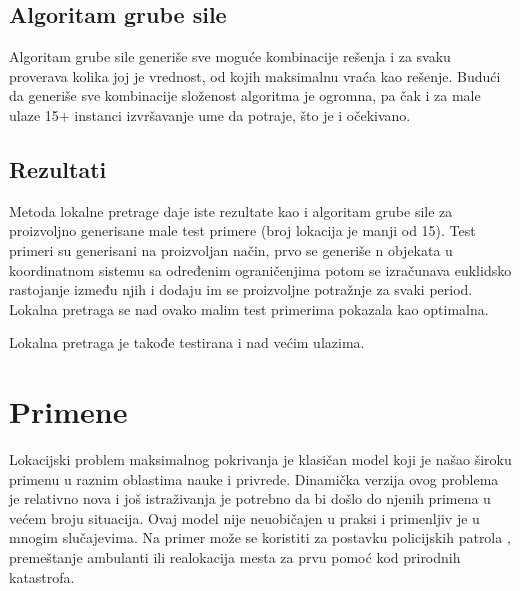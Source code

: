 \documentclass[a4paper]{article}
\begin{document}
\subsection{Algoritam grube sile}
Algoritam grube sile generiše sve moguće kombinacije rešenja i za svaku proverava kolika joj je vrednost, od kojih maksimalnu vraća kao rešenje. Budući da generiše sve kombinacije složenost algoritma je ogromna, pa čak i za male ulaze 15+ instanci izvršavanje ume da potraje, što je i očekivano.

\subsection{Rezultati}
Metoda lokalne pretrage daje iste rezultate kao i algoritam grube sile za proizvoljno generisane male test primere (broj lokacija je manji od 15). Test primeri su generisani na proizvoljan način, prvo se generiše n objekata u koordinatnom sistemu sa određenim ograničenjima potom se izračunava euklidsko rastojanje između njih i dodaju im se proizvoljne potražnje za svaki period. Lokalna pretraga se nad ovako malim test primerima pokazala kao optimalna.

Lokalna pretraga je takođe testirana i nad većim ulazima.


\section{Primene}
Lokacijski problem maksimalnog pokrivanja je klasičan model koji je našao široku primenu u raznim oblastima nauke i privrede. Dinamička verzija ovog problema je relativno nova i još istraživanja je potrebno da bi došlo do njenih primena u većem broju situacija. Ovaj model nije neuobičajen u praksi i primenljiv je u mnogim slučajevima. Na primer može se koristiti za postavku policijskih patrola \cite{police}, premeštanje ambulanti \cite{ambulance} ili realokacija mesta za prvu pomoć kod prirodnih katastrofa.

\appendix
 

\end{document}
